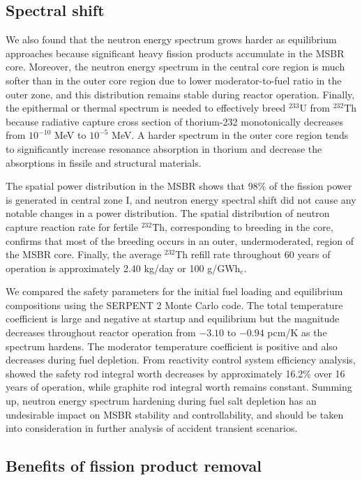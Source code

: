 \subsection{Spectral shift}
We also found that the neutron energy spectrum grows harder as equilibrium 
approaches because significant heavy fission products accumulate in 
the \gls{MSBR} core. Moreover, the neutron energy spectrum in the central core 
region is much softer than in the outer core region due to lower 
moderator-to-fuel ratio in the outer zone, and this distribution remains stable 
during reactor operation. Finally, the epithermal or thermal spectrum is needed 
to effectively breed $^{233}$U from $^{232}$Th because radiative capture cross 
section of thorium-232 monotonically decreases from $10^{-10}$ MeV to $10^{-5}$ 
MeV. A harder spectrum in the outer core region tends to significantly increase 
resonance absorption in thorium and decrease the absorptions in fissile and 
structural materials. 

The spatial power distribution in the \gls{MSBR} shows that 98\% of the fission 
power is generated in central zone I, and neutron energy spectral shift did not 
cause any notable changes in a power distribution. The spatial distribution of 
neutron capture reaction rate for fertile $^{232}$Th, corresponding to breeding in 
the core, confirms that most of the breeding occurs in an outer, 
undermoderated, region of the \gls{MSBR} core. Finally, the average $^{232}$Th 
refill rate throughout 60 years of operation is approximately 2.40 kg/day or 
100 g/GWh$_e$.

We compared the safety parameters for the initial fuel loading and 
equilibrium compositions using the SERPENT 2 Monte Carlo code. 
The total temperature coefficient 
is large and negative at startup and equilibrium but the magnitude decreases 
throughout reactor operation from $-3.10$ to $-0.94$ pcm/K as the spectrum 
hardens. The moderator 
temperature coefficient is positive and also decreases during fuel depletion. 
From reactivity control system efficiency analysis, showed the safety rod integral 
worth decreases by approximately 16.2\% over 16 years of operation, while 
graphite rod integral worth remains constant. Summing up, neutron energy 
spectrum hardening during fuel salt depletion has an undesirable impact on 
\gls{MSBR} stability and controllability, and should be taken into 
consideration in further analysis of accident transient scenarios.

\subsection{Benefits of fission product removal}

